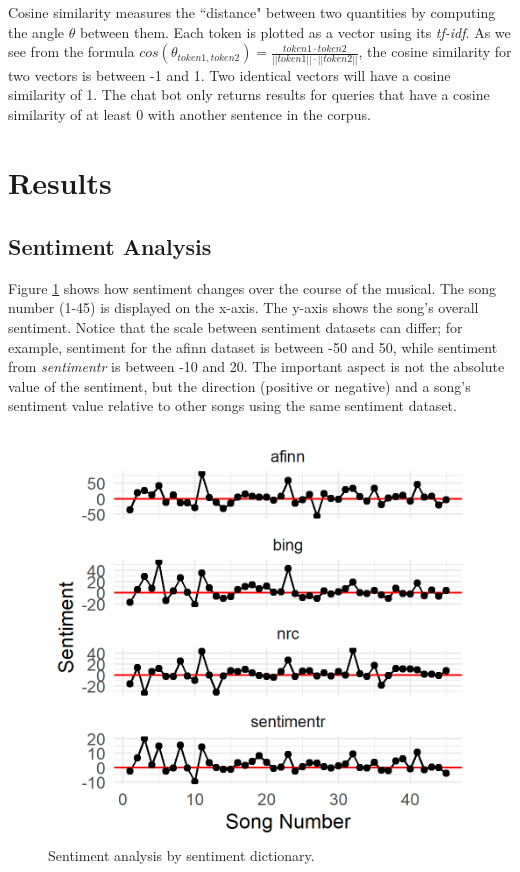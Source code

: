 \documentclass{article}
\begin{document}
Cosine similarity measures the ``distance" between two quantities by computing the angle $\theta$ between them. Each token is plotted as a vector using its \emph{tf-idf}. As we see from the formula $cos(\theta_{token1, token2}) = \frac {token1 \cdot token2}{||token1|| \cdot ||token2||}$, the cosine similarity for two vectors is between -1 and 1. Two identical vectors will have a cosine similarity of 1. The chat bot only returns results for queries that have a cosine similarity of at least 0 with another sentence in the corpus. 

\section{Results}

\subsection{Sentiment Analysis}

Figure \ref{fig:sentiment} shows how sentiment changes over the course of the musical. The song number (1-45) is displayed on the x-axis. The y-axis shows the song's overall sentiment. Notice that the scale between sentiment datasets can differ; for example, sentiment for the afinn dataset is between -50 and 50, while sentiment from \emph{sentimentr} is between -10 and 20. The important aspect is not the absolute value of the sentiment, but the direction (positive or negative) and a song's sentiment value relative to other songs using the same sentiment dataset. 

\begin{figure}[h]
    \caption{Sentiment analysis by sentiment dictionary. \label{fig:sentiment}}
    \centering
    \includegraphics[width=0.5\paperwidth, scale=1]{sentiment_by_stopwords.png}
\end{figure}
\end{document}
